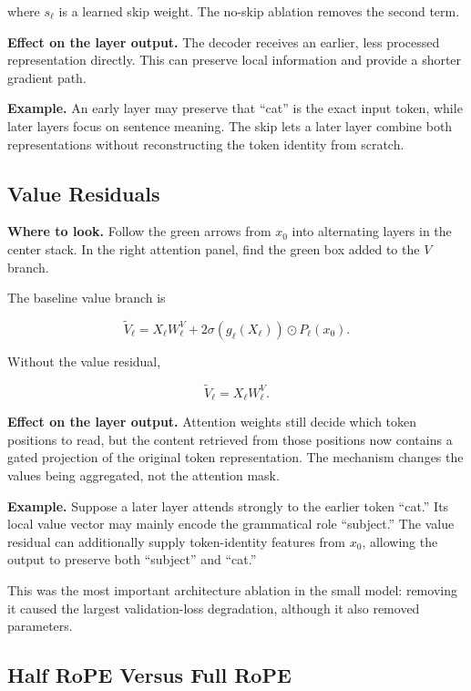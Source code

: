 \documentclass[11pt,a4paper]{article}
\begin{document}
where $s_\ell$ is a learned skip weight. The no-skip ablation removes the second
term.

\textbf{Effect on the layer output.} The decoder receives an earlier, less
processed representation directly. This can preserve local information and
provide a shorter gradient path.

\textbf{Example.} An early layer may preserve that ``cat'' is the exact input
token, while later layers focus on sentence meaning. The skip lets a later layer
combine both representations without reconstructing the token identity from
scratch.

\subsection{Value Residuals}

\textbf{Where to look.} Follow the green arrows from $x_0$ into alternating
layers in the center stack. In the right attention panel, find the green box
added to the $V$ branch.

The baseline value branch is

\begin{equation}
  \widetilde V_\ell
  =X_\ell W_\ell^V
   +2\sigma(g_\ell(X_\ell))\odot P_\ell(x_0).
\end{equation}

Without the value residual,

\begin{equation}
  \widetilde V_\ell=X_\ell W_\ell^V.
\end{equation}

\textbf{Effect on the layer output.} Attention weights still decide which token
positions to read, but the content retrieved from those positions now contains
a gated projection of the original token representation. The mechanism changes
the values being aggregated, not the attention mask.

\textbf{Example.} Suppose a later layer attends strongly to the earlier token
``cat.'' Its local value vector may mainly encode the grammatical role
``subject.'' The value residual can additionally supply token-identity features
from $x_0$, allowing the output to preserve both ``subject'' and ``cat.''

This was the most important architecture ablation in the small model: removing
it caused the largest validation-loss degradation, although it also removed
parameters.

\subsection{Half RoPE Versus Full RoPE}
\end{document}
